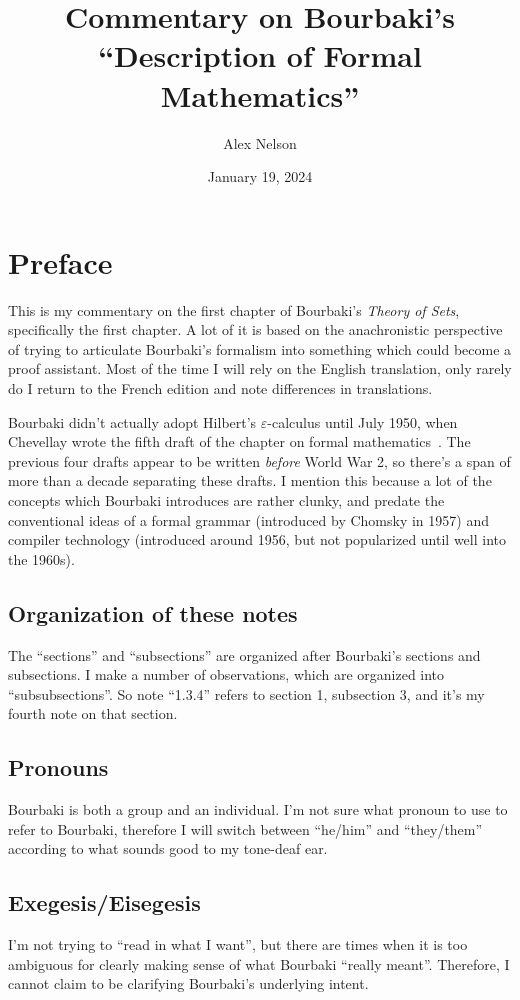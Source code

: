 \documentclass{amsart}
\title{Commentary on Bourbaki's ``Description of Formal Mathematics''}
\author{Alex Nelson}
\date{January 19, 2024}
\begin{document}
\maketitle

\section{Preface}

This is my commentary on the first chapter of Bourbaki's \textit{Theory of Sets},
specifically the first chapter. A lot of it is based on the
anachronistic perspective of trying to articulate Bourbaki's formalism
into something which could become a proof assistant. Most of the time I
will rely on the English translation, only rarely do I return to the
French edition and note differences in translations.

Bourbaki didn't actually adopt Hilbert's $\varepsilon$-calculus until
July 1950, when Chevellay wrote the fifth draft of the chapter on formal
mathematics~\cite{archives-no139}. The previous four drafts appear to be
written \emph{before} World War 2, so there's a span of more than a
decade separating these drafts. I mention this because a lot of the
concepts which Bourbaki introduces are rather clunky, and predate the
conventional ideas of a formal grammar (introduced by Chomsky in 1957)
and compiler technology (introduced around 1956, but not popularized
until well into the 1960s).

\subsection{Organization of these notes}
The ``sections'' and ``subsections'' are organized after Bourbaki's
sections and subsections. I make a number of observations, which are
organized into ``subsubsections''. So note ``1.3.4'' refers to section
1, subsection 3, and it's my fourth note on that section.

\subsection{Pronouns}
Bourbaki is both a group and an individual. I'm not sure what pronoun to
use to refer to Bourbaki, therefore I will switch between ``he/him'' and
``they/them'' according to what sounds good to my tone-deaf ear.

\subsection{Exegesis/Eisegesis}
I'm not trying to ``read in what I want'', but there are times when it
is too ambiguous for clearly making sense of what Bourbaki ``really meant''.
Therefore, I cannot claim to be clarifying Bourbaki's underlying intent.
\end{document}
